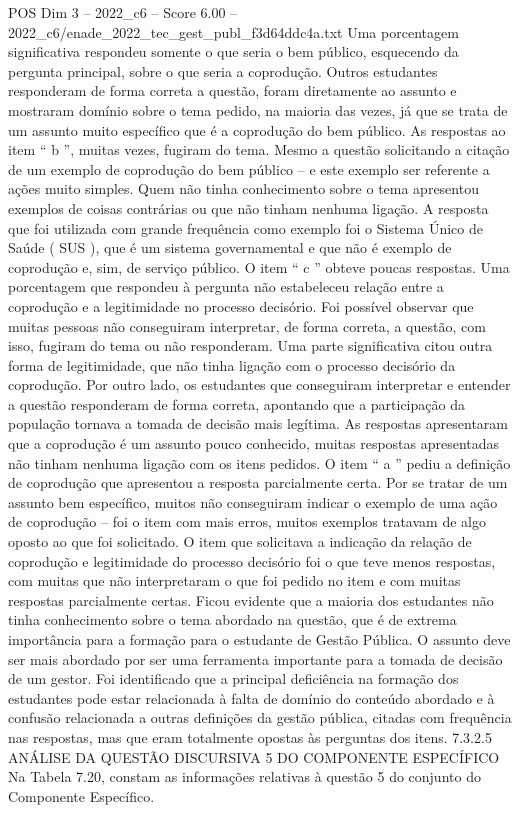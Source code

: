 \begin{textsample}{POS Dim 3 – 2022\_c6 – Score 6.00 – 2022\_c6/enade\_2022\_tec\_gest\_publ\_f3d64ddc4a.txt}
Uma porcentagem significativa respondeu somente o que seria o bem público, esquecendo da pergunta principal, sobre o que seria a coprodução.
Outros estudantes responderam de forma correta a questão, foram diretamente ao assunto e mostraram domínio sobre o tema pedido, na maioria das vezes, já que se trata de um assunto muito específico que é a coprodução do bem público.
As respostas ao item “ b ”, muitas vezes, fugiram do tema.
Mesmo a questão solicitando a citação de um exemplo de coprodução do bem público – e este exemplo ser referente a ações muito simples.
Quem não tinha conhecimento sobre o tema apresentou exemplos de coisas contrárias ou que não tinham nenhuma ligação.
A resposta que foi utilizada com grande frequência como exemplo foi o Sistema Único de Saúde ( SUS ), que é um sistema governamental e que não é exemplo de coprodução e, sim, de serviço público.
O item “ c ” obteve poucas respostas.
Uma porcentagem que respondeu à pergunta não estabeleceu relação entre a coprodução e a legitimidade no processo decisório.
Foi possível observar que muitas pessoas não conseguiram interpretar, de forma correta, a questão, com isso, fugiram do tema ou não responderam.
Uma parte significativa citou outra forma de legitimidade, que não tinha ligação com o processo decisório da coprodução.
Por outro lado, os estudantes que conseguiram interpretar e entender a questão responderam de forma correta, apontando que a participação da população tornava a tomada de decisão mais legítima.
As respostas apresentaram que a coprodução é um assunto pouco conhecido, muitas respostas apresentadas não tinham nenhuma ligação com os itens pedidos.
O item “ a ” pediu a definição de coprodução que apresentou a resposta parcialmente certa.
Por se tratar de um assunto bem específico, muitos não conseguiram indicar o exemplo de uma ação de coprodução – foi o item com mais erros, muitos exemplos tratavam de algo oposto ao que foi solicitado.
O item que solicitava a indicação da relação de coprodução e legitimidade do processo decisório foi o que teve menos respostas, com muitas que não interpretaram o que foi pedido no item e com muitas respostas parcialmente certas.
Ficou evidente que a maioria dos estudantes não tinha conhecimento sobre o tema abordado na questão, que é de extrema importância para a formação para o estudante de Gestão Pública.
O assunto deve ser mais abordado por ser uma ferramenta importante para a tomada de decisão de um gestor.
Foi identificado que a principal deficiência na formação dos estudantes pode estar relacionada à falta de domínio do conteúdo abordado e à confusão relacionada a outras definições da gestão pública, citadas com frequência nas respostas, mas que eram totalmente opostas às perguntas dos itens. 7.3.2.5 ANÁLISE DA QUESTÃO DISCURSIVA 5 DO COMPONENTE ESPECÍFICO Na Tabela 7.20, constam as informações relativas à questão 5 do conjunto do Componente Específico.

\end{textsample}
